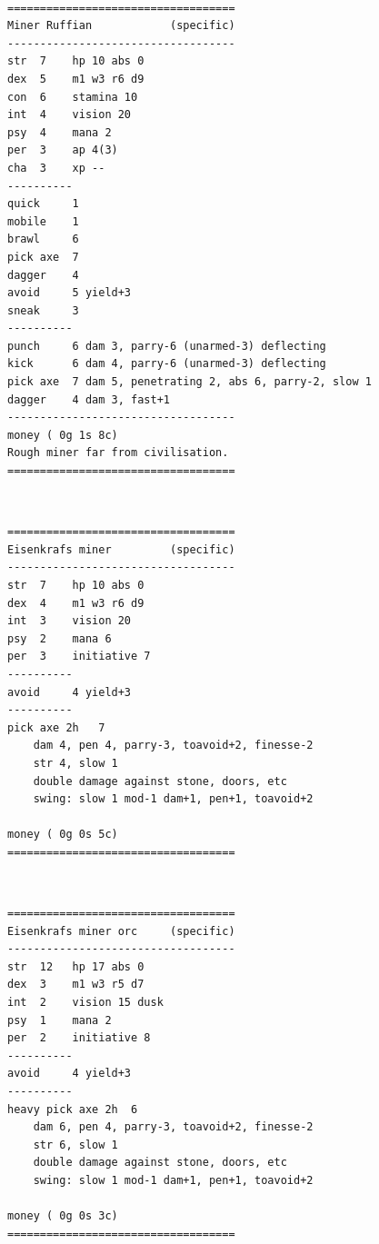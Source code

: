 \

\goodbreak \begin{samepage} \vsmall \begin{verbatim}
===================================
Miner Ruffian            (specific)
-----------------------------------
str  7    hp 10 abs 0
dex  5    m1 w3 r6 d9
con  6    stamina 10
int  4    vision 20
psy  4    mana 2
per  3    ap 4(3)
cha  3    xp --
----------
quick     1
mobile    1
brawl     6
pick axe  7
dagger    4
avoid     5 yield+3
sneak     3
----------
punch     6 dam 3, parry-6 (unarmed-3) deflecting
kick      6 dam 4, parry-6 (unarmed-3) deflecting
pick axe  7 dam 5, penetrating 2, abs 6, parry-2, slow 1
dagger    4 dam 3, fast+1
-----------------------------------
money ( 0g 1s 8c)
Rough miner far from civilisation.
===================================
\end{verbatim} \normalsize \end{samepage}

\

\goodbreak \begin{samepage} \vsmall \begin{verbatim}
===================================
Eisenkrafs miner         (specific)
-----------------------------------
str  7    hp 10 abs 0
dex  4    m1 w3 r6 d9
int  3    vision 20
psy  2    mana 6
per  3    initiative 7
----------
avoid     4 yield+3
----------
pick axe 2h   7
    dam 4, pen 4, parry-3, toavoid+2, finesse-2
    str 4, slow 1
    double damage against stone, doors, etc
    swing: slow 1 mod-1 dam+1, pen+1, toavoid+2

money ( 0g 0s 5c)
===================================
\end{verbatim} \normalsize \end{samepage}

\

\goodbreak \begin{samepage} \vsmall \begin{verbatim}
===================================
Eisenkrafs miner orc     (specific)
-----------------------------------
str  12   hp 17 abs 0
dex  3    m1 w3 r5 d7
int  2    vision 15 dusk
psy  1    mana 2
per  2    initiative 8
----------
avoid     4 yield+3
----------
heavy pick axe 2h  6
    dam 6, pen 4, parry-3, toavoid+2, finesse-2
    str 6, slow 1
    double damage against stone, doors, etc
    swing: slow 1 mod-1 dam+1, pen+1, toavoid+2

money ( 0g 0s 3c)
===================================
\end{verbatim} \normalsize \end{samepage}

